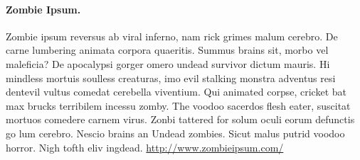 \documentclass[12pt,        %
  english,ngerman,          %
  paper=a4,                 %
  captions=tablesignature,  %
  listof=numbered,          %
  bibliography=totoc,       %
  headings=small,           %
  headinclude=false,        %
  footinclude=false,        %
  parskip=half-,            %
  oneside,                  %
  DIV=12                    %
]{styles/colireport}
\begin{document}
\paragraph*{Zombie Ipsum.}  Zombie ipsum reversus ab viral inferno, nam rick grimes malum cerebro. De carne lumbering animata corpora quaeritis. Summus brains sit, morbo vel maleficia? De apocalypsi gorger omero undead survivor dictum mauris. Hi mindless mortuis soulless creaturas, imo evil stalking monstra adventus resi dentevil vultus comedat cerebella viventium. Qui animated corpse, cricket bat max brucks terribilem incessu zomby. The voodoo sacerdos flesh eater, suscitat mortuos comedere carnem virus. Zonbi tattered for solum oculi eorum defunctis go lum cerebro. Nescio brains an Undead zombies. Sicut malus putrid voodoo horror. Nigh tofth eliv ingdead.
\url{http://www.zombieipsum.com/}



\cleardoublepage





\end{document}
